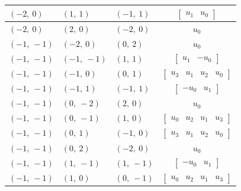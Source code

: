 \documentclass[11pt]{article}
\theoremstyle{definition}
\begin{document}
\begin{longtable}{|l|l|l|c|}
    \hline
    $\left( -2, \  0\right)$ & $\left( 1, \  1\right)$ & $\left( -1, \  1\right)$ & $\left[\begin{matrix}u_{1} & u_{0}\end{matrix}\right]$ \\
    \hline
    $\left( -2, \  0\right)$ & $\left( 2, \  0\right)$ & $\left( -2, \  0\right)$ & $u_{0}$ \\
    \hline
    $\left( -1, \  -1\right)$ & $\left( -2, \  0\right)$ & $\left( 0, \  2\right)$ & $u_{0}$ \\
    \hline
    $\left( -1, \  -1\right)$ & $\left( -1, \  -1\right)$ & $\left( 1, \  1\right)$ & $\left[\begin{matrix}u_{1} & - u_{0}\end{matrix}\right]$ \\
    \hline
    $\left( -1, \  -1\right)$ & $\left( -1, \  0\right)$ & $\left( 0, \  1\right)$ & $\left[\begin{matrix}u_{3} & u_{1} & u_{2} & u_{0}\end{matrix}\right]$ \\
    \hline
    $\left( -1, \  -1\right)$ & $\left( -1, \  1\right)$ & $\left( -1, \  1\right)$ & $\left[\begin{matrix}- u_{0} & u_{1}\end{matrix}\right]$ \\
    \hline
    $\left( -1, \  -1\right)$ & $\left( 0, \  -2\right)$ & $\left( 2, \  0\right)$ & $u_{0}$ \\
    \hline
    $\left( -1, \  -1\right)$ & $\left( 0, \  -1\right)$ & $\left( 1, \  0\right)$ & $\left[\begin{matrix}u_{0} & u_{2} & u_{1} & u_{3}\end{matrix}\right]$ \\
    \hline
    $\left( -1, \  -1\right)$ & $\left( 0, \  1\right)$ & $\left( -1, \  0\right)$ & $\left[\begin{matrix}u_{3} & u_{1} & u_{2} & u_{0}\end{matrix}\right]$ \\
    \hline
    $\left( -1, \  -1\right)$ & $\left( 0, \  2\right)$ & $\left( -2, \  0\right)$ & $u_{0}$ \\
    \hline
    $\left( -1, \  -1\right)$ & $\left( 1, \  -1\right)$ & $\left( 1, \  -1\right)$ & $\left[\begin{matrix}- u_{0} & u_{1}\end{matrix}\right]$ \\
    \hline
    $\left( -1, \  -1\right)$ & $\left( 1, \  0\right)$ & $\left( 0, \  -1\right)$ & $\left[\begin{matrix}u_{0} & u_{2} & u_{1} & u_{3}\end{matrix}\right]$ \\

\end{longtable}
\end{document}
